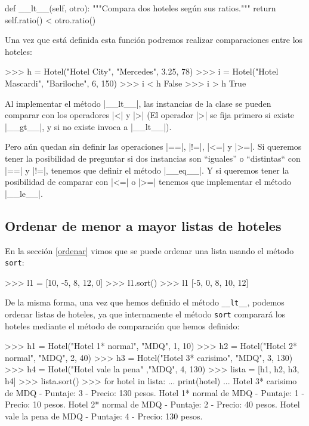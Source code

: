 \begin{codigo-python-sn}
    def __lt__(self, otro):
        """Compara dos hoteles según sus ratios."""
        return self.ratio() < otro.ratio()
\end{codigo-python-sn}

Una vez que está definida esta función podremos realizar comparaciones
entre los hoteles:

\begin{codigo-python-sn}
>>> h = Hotel("Hotel City", "Mercedes", 3.25, 78)
>>> i = Hotel("Hotel Mascardi", "Bariloche", 6, 150)
>>> i < h
False
>>> i > h
True
\end{codigo-python-sn}

Al implementar el método |__lt__|, las instancias de la clase se pueden
comparar con los operadores |<| y |>| (El operador |>| se fija primero si
existe |__gt__|, y si no existe invoca a |__lt__|).

Pero aún quedan sin definir las operaciones |==|, |!=|, |<=| y |>=|.  Si
queremos tener la posibilidad de preguntar si dos instancias son ``iguales'' o
``distintas`` con |==| y |!=|, tenemos que definir el método |__eq__|. Y si
queremos tener la posibilidad de comparar con |<=| o |>=| tenemos que
implementar el método |__le__|.

\subsection{Ordenar de menor a mayor listas de hoteles}

En la sección \ref{ordenar} vimos que se puede ordenar una lista usando el
método \lstinline!sort!:

\begin{codigo-python-sn}
>>> l1 = [10, -5, 8, 12, 0]
>>> l1.sort()
>>> l1
[-5, 0, 8, 10, 12]
\end{codigo-python-sn}

De la misma forma, una vez que hemos definido el método
\lstinline!__lt__!, podemos ordenar listas de hoteles, ya que
internamente el método \lstinline!sort! comparará los hoteles mediante
el método de comparación que hemos definido:

\begin{codigo-python-sn}
>>> h1 = Hotel("Hotel 1* normal", "MDQ", 1, 10)
>>> h2 = Hotel("Hotel 2* normal", "MDQ", 2, 40)
>>> h3 = Hotel("Hotel 3* carisimo", "MDQ", 3, 130)
>>> h4 = Hotel("Hotel vale la pena" ,"MDQ", 4, 130)
>>> lista = [h1, h2, h3, h4]
>>> lista.sort()
>>> for hotel in lista:
...     print(hotel)
...
Hotel 3* carisimo de MDQ - Puntaje: 3 - Precio: 130 pesos.
Hotel 1* normal de MDQ - Puntaje: 1 - Precio: 10 pesos.
Hotel 2* normal de MDQ - Puntaje: 2 - Precio: 40 pesos.
Hotel vale la pena de MDQ - Puntaje: 4 - Precio: 130 pesos.
\end{codigo-python-sn}

